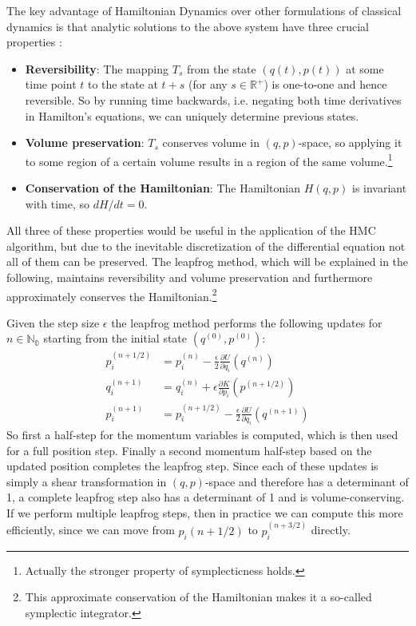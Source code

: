\documentclass[12pt]{scrartcl}
\begin{document}
The key advantage of Hamiltonian Dynamics over other formulations of classical dynamics is that analytic solutions to the above system have three crucial properties \citep{Neal2011}:
\begin{itemize}
\item \textbf{Reversibility}: The mapping $T_s$ from the state $(q(t), p(t))$ at some time point $t$ to the state at $t+s$ (for any $s \in \mathbb{R^+}$) is one-to-one and hence reversible. So by running time backwards, i.e. negating both time derivatives in Hamilton's equations, we can uniquely determine previous states.
\item \textbf{Volume preservation}: $T_s$ conserves volume in $(q, p)$-space, so applying it to some region of a certain volume results in a region of the same volume.\footnote{Actually the stronger property of symplecticness holds.}
\item \textbf{Conservation of the Hamiltonian}: The Hamiltonian $H(q, p)$ is invariant with time, so $dH/dt = 0$.
\end{itemize}

All three of these properties would be useful in the application of the HMC algorithm, but due to the inevitable discretization of the differential equation not all of them can be preserved. The leapfrog method, which will be explained in the following, maintains reversibility and volume preservation and furthermore approximately conserves the Hamiltonian.\footnote{This approximate conservation of the Hamiltonian makes it a so-called symplectic integrator.}

Given the step size $\epsilon$ the leapfrog method performs the following updates for $n \in \mathbb{N_0}$ starting from the initial state $(q^{(0)}, p^{(0)})$:
\begin{equation}
\begin{split}
p_i^{(n + 1/2)} &= p_i^{(n)} - \frac{\epsilon}{2} \frac{\partial U}{\partial q_i}(q^{(n)}) \\
q_i^{(n + 1)} &= q_i^{(n)} + \epsilon \frac{\partial K}{\partial p_i}(p^{(n + 1/2)}) \\
p_i^{(n + 1)} &= p_i^{(n + 1/2)} - \frac{\epsilon}{2} \frac{\partial U}{\partial q_i}(q^{(n + 1)})
\end{split}
\end{equation}
So first a half-step for the momentum variables is computed, which is then used for a full position step. Finally a second momentum half-step based on the updated position completes the leapfrog step. Since each of these updates is simply a shear transformation in $(q, p)$-space and therefore has a determinant of 1, a complete leapfrog step also has a determinant of 1 and is volume-conserving. If we perform multiple leapfrog steps, then in practice we can compute this more efficiently, since we can move from $p_i{(n + 1/2)}$ to $p_i^{(n + 3/2)}$ directly.
\end{document}
